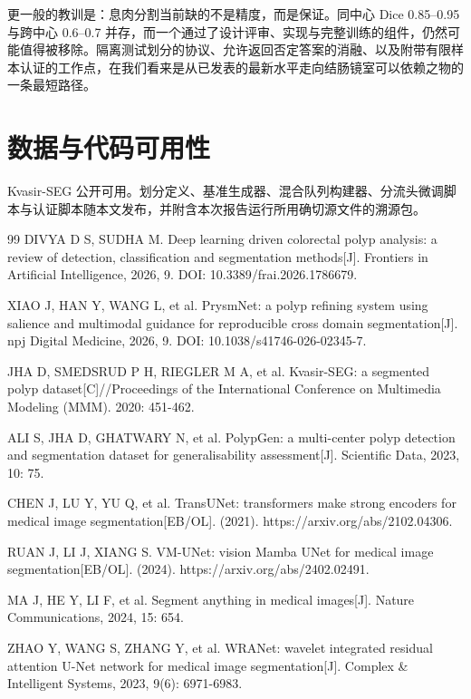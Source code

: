 \documentclass[conference]{IEEEtran}
\begin{document}
更一般的教训是：息肉分割当前缺的不是精度，而是保证。同中心 Dice 0.85–0.95 与跨中心 0.6–0.7 并存，而一个通过了设计评审、实现与完整训练的组件，仍然可能值得被移除。隔离测试划分的协议、允许返回否定答案的消融、以及附带有限样本认证的工作点，在我们看来是从已发表的最新水平走向结肠镜室可以依赖之物的一条最短路径。

\section{数据与代码可用性}

Kvasir-SEG 公开可用。划分定义、基准生成器、混合队列构建器、分流头微调脚本与认证脚本随本文发布，并附含本次报告运行所用确切源文件的溯源包。

\begin{thebibliography}{99}
DIVYA D S, SUDHA M. Deep learning driven colorectal polyp analysis: a review of detection, classification and segmentation methods[J]. Frontiers in Artificial Intelligence, 2026, 9. DOI: 10.3389/frai.2026.1786679.

XIAO J, HAN Y, WANG L, et al. PrysmNet: a polyp refining system using salience and multimodal guidance for reproducible cross domain segmentation[J]. npj Digital Medicine, 2026, 9. DOI: 10.1038/s41746-026-02345-7.

JHA D, SMEDSRUD P H, RIEGLER M A, et al. Kvasir-SEG: a segmented polyp dataset[C]//Proceedings of the International Conference on Multimedia Modeling (MMM). 2020: 451-462.

ALI S, JHA D, GHATWARY N, et al. PolypGen: a multi-center polyp detection and segmentation dataset for generalisability assessment[J]. Scientific Data, 2023, 10: 75.

CHEN J, LU Y, YU Q, et al. TransUNet: transformers make strong encoders for medical image segmentation[EB/OL]. (2021). https://arxiv.org/abs/2102.04306.

RUAN J, LI J, XIANG S. VM-UNet: vision Mamba UNet for medical image segmentation[EB/OL]. (2024). https://arxiv.org/abs/2402.02491.

MA J, HE Y, LI F, et al. Segment anything in medical images[J]. Nature Communications, 2024, 15: 654.

ZHAO Y, WANG S, ZHANG Y, et al. WRANet: wavelet integrated residual attention U-Net network for medical image segmentation[J]. Complex \& Intelligent Systems, 2023, 9(6): 6971-6983.


\end{thebibliography}
\end{document}
